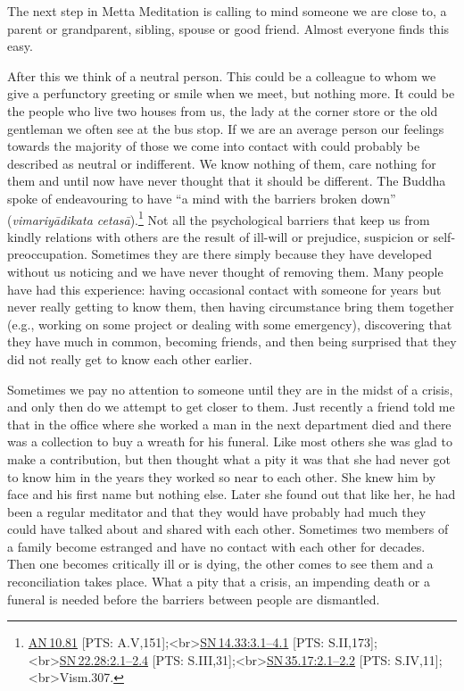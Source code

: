 \documentclass[10pt, openright]{book}
\begin{document}
The next step in Metta Meditation is calling to mind someone we are close to, a parent or grandparent, sibling, spouse or good friend. Almost everyone finds this easy.


After this we think of a neutral person. This could be a colleague to whom we give a perfunctory greeting or smile when we meet, but nothing more. It could be the people who live two houses from us, the lady at the corner store or the old gentleman we often see at the bus stop. If we are an average person our feelings towards the majority of those we come into contact with could probably be described as neutral or indifferent. We know nothing of them, care nothing for them and until now have never thought that it should be different. The Buddha spoke of endeavouring to have “a mind with the barriers broken down” (\textit{vimariyādikata cetasā}).\footnote {\href{https://suttacentral.net/an10.81/en/sujato}{AN 10.81} [PTS: A.V,151];<br>\href{https://suttacentral.net/sn14.33/en/sujato\#3.1}{SN 14.33:3.1–4.1} [PTS: S.II,173];<br>\href{https://suttacentral.net/sn22.28/en/sujato\#2.1}{SN 22.28:2.1–2.4} [PTS: S.III,31];<br>\href{https://suttacentral.net/sn35.17/en/sujato\#2.1}{SN 35.17:2.1–2.2} [PTS: S.IV,11];<br>Vism.307.} Not all the psychological barriers that keep us from kindly relations with others are the result of ill-will or prejudice, suspicion or self-preoccupation. Sometimes they are there simply because they have developed without us noticing and we have never thought of removing them. Many people have had this experience: having occasional contact with someone for years but never really getting to know them, then having circumstance bring them together (e.g., working on some project or dealing with some emergency), discovering that they have much in common, becoming friends, and then being surprised that they did not really get to know each other earlier.


Sometimes we pay no attention to someone until they are in the midst of a crisis, and only then do we attempt to get closer to them. Just recently a friend told me that in the office where she worked a man in the next department died and there was a collection to buy a wreath for his funeral. Like most others she was glad to make a contribution, but then thought what a pity it was that she had never got to know him in the years they worked so near to each other. She knew him by face and his first name but nothing else. Later she found out that like her, he had been a regular meditator and that they would have probably had much they could have talked about and shared with each other. Sometimes two members of a family become estranged and have no contact with each other for decades. Then one becomes critically ill or is dying, the other comes to see them and a reconciliation takes place. What a pity that a crisis, an impending death or a funeral is needed before the barriers between people are dismantled.
\end{document}
